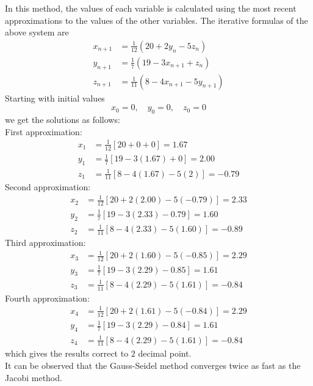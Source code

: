 \documentclass[12pt,class=book,crop=false]{standalone}
\begin{document}
In this method, the values of each variable is calculated using the most recent approximations to the values of the other variables. The iterative formulas of the above system are
\begin{align*}
    x_{n+1} & =\frac{1}{12}\left(20+2y_n-5z_n\right)        \\
    y_{n+1} & =\frac{1}{7}\left(19-3x_{n+1}+z_n\right)      \\
    z_{n+1} & =\frac{1}{11}\left(8-4x_{n+1}-5y_{n+1}\right)
\end{align*}
Starting with initial values
\[x_0=0,\quad y_0=0,\quad z_0=0\]
we get the solutions as follows:\\
First approximation:
\begin{align*}
    x_1 & =\frac{1}{12}[20+0+0]=1.67          \\
    y_1 & =\frac{1}{7}[19-3(1.67)+0]=2.00     \\
    z_1 & =\frac{1}{11}[8-4(1.67)-5(2)]=-0.79
\end{align*}
Second approximation:
\begin{align*}
    x_2 & =\frac{1}{12}[20+2(2.00)-5(-0.79)]=2.33 \\
    y_2 & =\frac{1}{7}[19-3(2.33)-0.79]=1.60      \\
    z_2 & =\frac{1}{11}[8-4(2.33)-5(1.60)]=-0.89
\end{align*}
Third approximation:
\begin{align*}
    x_3 & =\frac{1}{12}[20+2(1.60)-5(-0.85)]=2.29 \\
    y_3 & =\frac{1}{7}[19-3(2.29)-0.85]=1.61      \\
    z_3 & =\frac{1}{11}[8-4(2.29)-5(1.61)]=-0.84
\end{align*}
Fourth approximation:
\begin{align*}
    x_4 & =\frac{1}{12}[20+2(1.61)-5(-0.84)]=2.29 \\
    y_4 & =\frac{1}{7}[19-3(2.29)-0.84]=1.61      \\
    z_4 & =\frac{1}{11}[8-4(2.29)-5(1.61)]=-0.84
\end{align*}
which gives the results correct to $ 2 $ decimal point.\\
It can be observed that the Gauss-Seidel method converges twice as fast as the Jacobi method.
\end{document}
